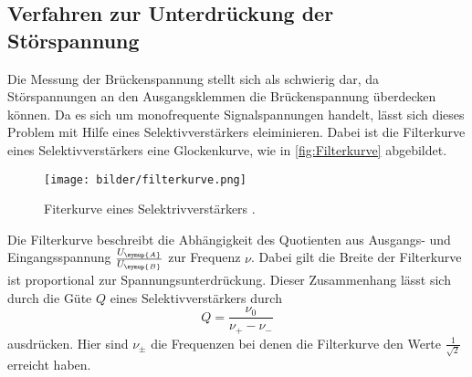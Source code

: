 \subsection{Verfahren zur Unterdrückung der Störspannung}
\label{sec:stoer}
Die Messung der Brückenspannung stellt sich als schwierig dar, da Störspannungen an den Ausgangsklemmen die
Brückenspannung überdecken können. Da es sich um monofrequente Signalspannungen handelt, lässt sich dieses
Problem mit Hilfe eines Selektivverstärkers eleiminieren. Dabei ist die Filterkurve eines Selektivverstärkers
eine Glockenkurve, wie in \autoref{fig:Filterkurve} abgebildet.
\begin{figure}
    \centering
    \texttt{[image: bilder/filterkurve.png]}
    \caption{Fiterkurve eines Selektrivverstärkers \cite{sample}.}
    \label{fig:Filterkurve}
\end{figure}
Die Filterkurve beschreibt die Abhängigkeit des Quotienten aus Ausgangs- und Eingangsspannung
$\frac{U_{\symup{A}}}{U_{\symup{B}}}$ zur Frequenz $\nu$. Dabei gilt die Breite der Filterkurve ist proportional
zur Spannungsunterdrückung. Dieser Zusammenhang lässt sich durch die Güte $Q$ eines Selektivverstärkers
durch
\begin{equation}
    \label{eqn:Guete}
    Q = \frac{\nu_{0}}{\nu_{+}-\nu_{-}}
\end{equation}
ausdrücken. Hier sind $\nu_{\pm}$ die Frequenzen bei denen die Filterkurve den Werte $\frac{1}{\sqrt{2}}$ erreicht
haben.